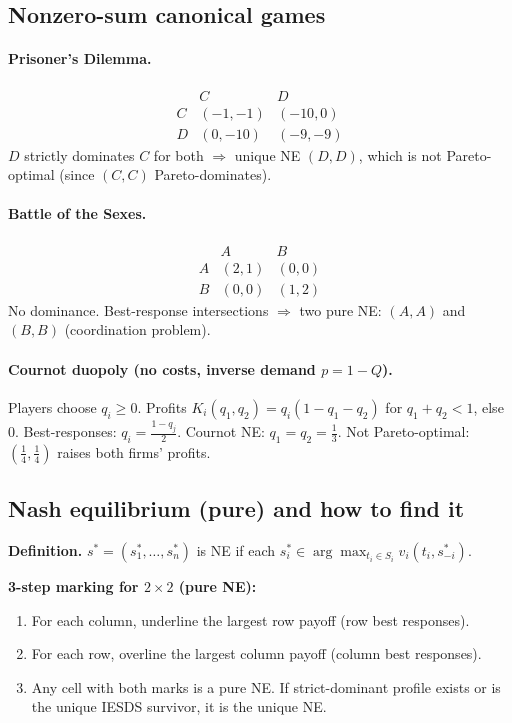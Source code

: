 \documentclass[11pt]{article}
\begin{document}
\begin{multicols}{2}
\subsection*{Nonzero-sum canonical games}
\paragraph{Prisoner’s Dilemma.}
\[
\begin{array}{c|cc}
 & C & D\\\hline
C &(-1,-1)&(-10,0)\\
D &(0,-10)&(-9,-9)
\end{array}
\]
$D$ strictly dominates $C$ for both $\Rightarrow$ unique NE $(D,D)$, which is not Pareto-optimal (since $(C,C)$ Pareto-dominates).

\paragraph{Battle of the Sexes.}
\[
\begin{array}{c|cc}
 & A & B\\\hline
A&(2,1)&(0,0)\\
B&(0,0)&(1,2)
\end{array}
\]
No dominance. Best-response intersections $\Rightarrow$ two pure NE: $(A,A)$ and $(B,B)$ (coordination problem).

\paragraph{Cournot duopoly (no costs, inverse demand $p=1-Q$).}
Players choose $q_i\ge 0$. Profits $K_i(q_1,q_2)=q_i(1-q_1-q_2)$ for $q_1+q_2<1$, else $0$.
Best-responses: $q_i=\frac{1-q_j}{2}$. Cournot NE: $q_1=q_2=\tfrac{1}{3}$.
Not Pareto-optimal: $(\tfrac14,\tfrac14)$ raises both firms’ profits.

\subsection*{Nash equilibrium (pure) and how to find it}
\textbf{Definition.} $s^*=(s_1^*,\dots,s_n^*)$ is NE if each $s_i^*\in\arg\max_{t_i\in S_i}v_i(t_i,s_{-i}^*)$.

\textbf{3-step marking for $2\times 2$ (pure NE):}
\begin{enumerate}[label=\arabic*)]
  \item For each column, underline the largest row payoff (row best responses).
  \item For each row, overline the largest column payoff (column best responses).
  \item Any cell with both marks is a pure NE. If strict-dominant profile exists or is the unique IESDS survivor, it is the unique NE.
\end{enumerate}


\end{multicols}
\end{document}
